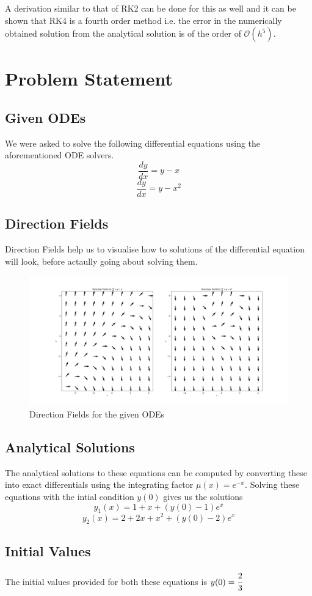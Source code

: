 \documentclass{scrartcl}
\begin{document}
A derivation similar to that of RK2 can be done for this as well and it can be shown that RK4 is a fourth order method i.e. the error in the numerically obtained solution from the analytical solution is of the order of $\mathcal{O}(h^5)$.

\section{Problem Statement}
\subsection{Given ODEs}
We were asked to solve the following differential equations using the aforementioned ODE solvers.
$$\frac{dy}{dx} = y - x$$
$$\frac{dy}{dx} = y - x^2$$

\subsection{Direction Fields}
Direction Fields help us to visualise how to solutions of the differential equation will look, before actaully going about solving them.
\begin{figure}[h]
    \centering
    \includegraphics[width=\linewidth]{"direction_fields.png"}
    \caption{Direction Fields for the given ODEs}
\end{figure}
\subsection{Analytical Solutions}
The analytical solutions to these equations can be computed by converting these into exact differentials using the integrating factor $\mu(x) = e^{-x}$. Solving these equations with the intial condition $y(0)$ gives us the solutions
$$y_1(x) = 1 + x + (y(0) - 1)e^x$$
$$y_2(x) = 2 + 2x + x^2 + (y(0) - 2)e^x$$
\subsection{Initial Values}
The initial values provided for both these equations is $y(0) = \cfrac{2}{3}$
\end{document}
